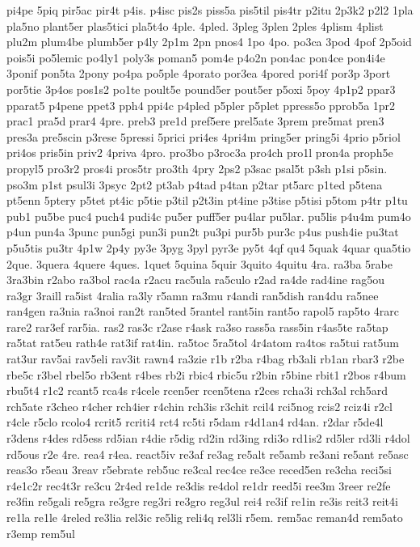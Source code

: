{pi4pe
5piq
pir5ac
pir4t
p4is.
p4isc
pis2s
piss5a
pis5til
pis4tr
p2itu
2p3k2
p2l2
1pla
pla5no
plant5er
plas5tici
pla5t4o
4ple.
4pled.
3pleg
3plen
2ples
4plism
4plist
plu2m
plum4be
plumb5er
p4ly
2p1m
2pn
pnos4
1po
4po.
po3ca
3pod
4pof
2p5oid
pois5i
po5lemic
po4ly1
poly3s
poman5
pom4e
p4o2n
pon4ac
pon4ce
pon4i4e
3ponif
pon5ta
2pony
po4pa
po5ple
4porato
por3ea
4pored
pori4f
por3p
3port
por5tie
3p4os
pos1s2
po1te
poult5e
pound5er
pout5er
p5oxi
5poy
4p1p2
ppar3
pparat5
p4pene
ppet3
pph4
ppi4c
p4pled
p5pler
p5plet
ppress5o
pprob5a
1pr2
prac1
pra5d
prar4
4pre.
preb3
pre1d
pref5ere
prel5ate
3prem
pre5mat
pren3
pres3a
pre5scin
p3rese
5pressi
5prici
pri4es
4pri4m
pring5er
pring5i
4prio
p5riol
pri4os
pris5in
priv2
4priva
4pro.
pro3bo
p3roc3a
pro4ch
pro1l
pron4a
proph5e
propyl5
pro3r2
pros4i
pros5tr
pro3th
4pry
2ps2
p3sac
psal5t
p3sh
p1si
p5sin.
pso3m
p1st
psul3i
3psyc
2pt2
pt3ab
p4tad
p4tan
p2tar
pt5arc
p1ted
p5tena
pt5enn
5ptery
p5tet
pt4ic
p5tie
p3til
p2t3in
pt4ine
p3tise
p5tisi
p5tom
p4tr
p1tu
pub1
pu5be
puc4
puch4
pudi4c
pu5er
puff5er
pu4lar
pu5lar.
pu5lis
p4u4m
pum4o
p4un
pun4a
3punc
pun5gi
pun3i
pun2t
pu3pi
pur5b
pur3c
p4us
push4ie
pu3tat
p5u5tis
pu3tr
4p1w
2p4y
py3e
3pyg
3pyl
pyr3e
py5t
4qf
qu4
5quak
4quar
qua5tio
2que.
3quera
4quere
4ques.
1quet
5quina
5quir
3quito
4quitu
4ra.
ra3ba
5rabe
3ra3bin
r2abo
ra3bol
rac4a
r2acu
rac5ula
ra5culo
r2ad
ra4de
rad4ine
rag5ou
ra3gr
3raill
ra5ist
4ralia
ra3ly
r5amn
ra3mu
r4andi
ran5dish
ran4du
ra5nee
ran4gen
ra3nia
ra3noi
ran2t
ran5ted
5rantel
rant5in
rant5o
rapol5
rap5to
4rarc
rare2
rar3ef
rar5ia.
ras2
ras3c
r2ase
r4ask
ra3so
rass5a
rass5in
r4as5te
ra5tap
ra5tat
rat5eu
rath4e
rat3if
rat4in.
ra5toc
5ra5tol
4r4atom
ra4tos
ra5tui
rat5um
rat3ur
rav5ai
rav5eli
rav3it
rawn4
ra3zie
r1b
r2ba
r4bag
rb3ali
rb1an
rbar3
r2be
rbe5c
r3bel
rbel5o
rb3ent
r4bes
rb2i
rbic4
rbic5u
r2bin
r5bine
rbit1
r2bos
r4bum
rbu5t4
r1c2
rcant5
rca4s
r4cele
rcen5er
rcen5tena
r2ces
rcha3i
rch3al
rch5ard
rch5ate
r3cheo
r4cher
rch4ier
r4chin
rch3is
r3chit
rcil4
rci5nog
rcis2
rciz4i
r2cl
r4cle
r5clo
rcolo4
rcrit5
rcriti4
rct4
rc5ti
r5dam
r4d1an4
rd4an.
r2dar
r5de4l
r3dens
r4des
rd5ess
rd5ian
r4die
r5dig
rd2in
rd3ing
rdi3o
rd1is2
rd5ler
rd3li
r4dol
rd5ous
r2e
4re.
rea4
r4ea.
react5iv
re3af
re3ag
re5alt
re5amb
re3ani
re5ant
re5asc
reas3o
r5eau
3reav
r5ebrate
reb5uc
re3cal
rec4ce
re3ce
reced5en
re3cha
reci5si
r4e1c2r
rec4t3r
re3cu
2r4ed
re1de
re3dis
re4dol
re1dr
reed5i
ree3m
3reer
re2fe
re3fin
re5gali
re5gra
re3gre
reg3ri
re3gro
reg3ul
rei4
re3if
re1in
re3is
reit3
reit4i
re1la
re1le
4reled
re3lia
rel3ic
re5lig
reli4q
rel3li
r5em.
rem5ac
reman4d
rem5ato
r3emp
rem5ul
}
